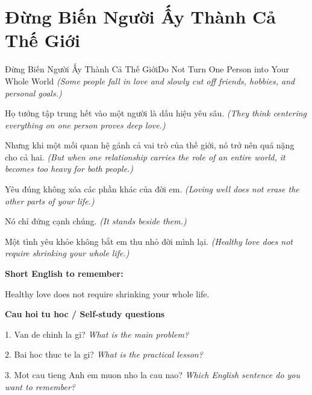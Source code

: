 \section{Đừng Biến Người Ấy Thành Cả Thế Giới}
\begin{truyen}{Đừng Biến Người Ấy Thành Cả Thế Giới}{Do Not Turn One Person into Your Whole World}
\textit{(Some people fall in love and slowly cut off friends, hobbies, and personal goals.)}

Họ tưởng tập trung hết vào một người là dấu hiệu yêu sâu.
\textit{(They think centering everything on one person proves deep love.)}

Nhưng khi một mối quan hệ gánh cả vai trò của thế giới, nó trở nên quá nặng cho cả hai.
\textit{(But when one relationship carries the role of an entire world, it becomes too heavy for both people.)}

Yêu đúng không xóa các phần khác của đời em.
\textit{(Loving well does not erase the other parts of your life.)}

Nó chỉ đứng cạnh chúng.
\textit{(It stands beside them.)}

\end{truyen}

\begin{baihoc}
Một tình yêu khỏe không bắt em thu nhỏ đời mình lại.
\textit{(Healthy love does not require shrinking your whole life.)}
\end{baihoc}

\begin{ghinhoanh}
\textbf{Short English to remember:}

Healthy love does not require shrinking your whole life.

\end{ghinhoanh}

\begin{tuhocnhanh}
\textbf{Cau hoi tu hoc / Self-study questions}

1. Van de chinh la gi? \textit{What is the main problem?}

2. Bai hoc thuc te la gi? \textit{What is the practical lesson?}

3. Mot cau tieng Anh em muon nho la cau nao? \textit{Which English sentence do you want to remember?}
\end{tuhocnhanh}
\ngancach

